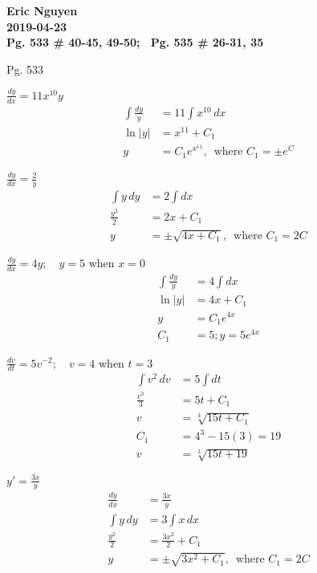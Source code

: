 \documentclass[12pt]{article}
\newenvironment{problem}[2][]{
    \begin{trivlist}
        \item[
            {\bfseries #1}
            {\bfseries #2.}
        ]
}{\end{trivlist}}
\newcommand{\assignment}{Pg. 533 \# 40-45, 49-50; \, Pg. 535 \# 26-31, 35}
\newcommand{\name}{Eric Nguyen}
\newcommand{\duedate}{2019-04-23}
\newcommand{\details}{\noindent\textbf{\name \\\duedate \\\assignment}}
\newcommand{\dx}{\, dx}
\newcommand{\dy}{\, dy}
\newcommand{\dv}{\, dv}
\begin{document}
\details

\bigskip

\noindent Pg. 533

\begin{problem}{40}
$\frac{dy}{dx} = 11x^{10}y$
\begin{align}
\int \frac{dy}{y} &= 11 \int x^{10} \dx \\
\ln\left|y\right| &= x^{11} + C_1 \\
y &= C_1e^{x^{11}}, \, \text{ where } C_1 = \pm e^C
\end{align}
\end{problem}

\begin{problem}{41}
$\frac{dy}{dx} = \frac{2}{y}$
\begin{align}
\int y \dy &= 2 \int dx \\
\frac{y^2}{2} &= 2x + C_1 \\
y &= \pm\sqrt{4x + C_1}, \, \text{ where } C_1 = 2C
\end{align}
\end{problem}

\begin{problem}{42}
$\frac{dy}{dx} = 4y; \quad y = 5$ when $x = 0$
\begin{align}
\int \frac{dy}{y} &= 4 \int dx \\
\ln\left|y\right| &= 4x + C_1 \\
y &= C_1e^{4x} \\
C_1 &= 5; y = 5e^{4x}
\end{align}
\end{problem}

\begin{problem}{43}
$\frac{dv}{dt} = 5v^{-2}; \quad v = 4$ when $t = 3$
\begin{align}
\int v^2 \dv &= 5 \int dt \\
\frac{v^3}{3} &= 5t + C_1 \\
v &= \sqrt[3]{15t + C_1} \\
C_1 &= 4^3 - 15(3) = 19 \\
v &= \sqrt[3]{15t + 19}
\end{align}
\end{problem}

\begin{problem}{44}
$y' = \frac{3x}{y}$
\begin{align}
\frac{dy}{dx} &= \frac{3x}{y} \\
\int y \dy &= 3 \int x \dx \\
\frac{y^2}{2} &= \frac{3x^2}{2} + C_1 \\
y &= \pm\sqrt{3x^2 + C_1}, \, \text{ where } C_1 = 2C
\end{align}
\end{problem}
\end{document}
